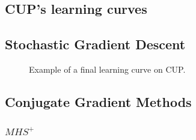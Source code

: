 \begin{appendices}



    \chapter{CUP's learning curves} %
    \label{cha:cup_learning_curves}

        \section{Stochastic Gradient Descent} %
        \label{sec:cup_sgd}

            \begin{figure}[H]
                \centering
                    \label{fig:cup_MSE_SGD}
                \caption{Example of a final learning curve on CUP.}
                \label{fig:cup_SGD}
            \end{figure}

        \section{Conjugate Gradient Methods}
        \label{sec:cgd}
            \subsection{$MHS^+$}
            \label{sec:cup_msh}


\end{appendices}
